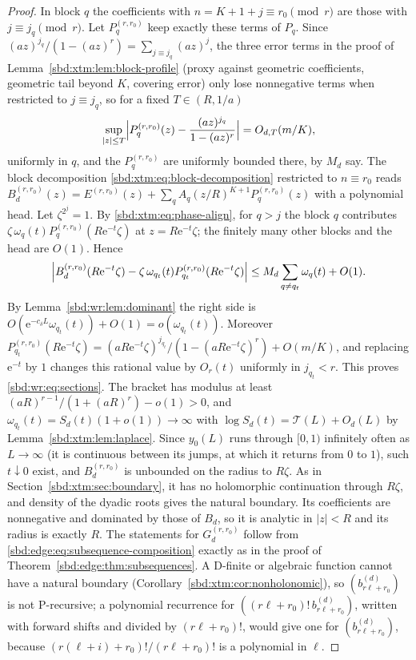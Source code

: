\documentclass[11pt,a4paper]{article}
\theoremstyle{definition}
\newcommand{\e}{\mathrm e}
\begin{document}
\begin{proof}
In block $q$ the coefficients with $n=K+1+j\equiv r_0\pmod r$ are those with
$j\equiv j_q\pmod r$. Let $P_q^{(r,r_0)}$ keep exactly these terms of $P_q$.
Since $(az)^{j_q}/(1-(az)^r)=\sum_{j\equiv j_q}(az)^j$, the three error terms
in the proof of Lemma~\ref{sbd:xtm:lem:block-profile} (proxy against
geometric coefficients, geometric tail beyond $K$, covering error) only lose
nonnegative terms when restricted to $j\equiv j_q$, so for a fixed
$T\in(R,1/a)$
\[
 \sup_{|z|\le T}\Bigl|P_q^{(r,r_0)}(z)-\frac{(az)^{j_q}}{1-(az)^r}\Bigr|
 =O_{d,T}(m/K),
\]
uniformly in $q$, and the $P_q^{(r,r_0)}$ are uniformly bounded there, by
$M_d$ say. The block decomposition \eqref{sbd:xtm:eq:block-decomposition}
restricted to $n\equiv r_0$ reads
$B_d^{(r,r_0)}(z)=E^{(r,r_0)}(z)+\sum_qA_q(z/R)^{K+1}P_q^{(r,r_0)}(z)$ with a
polynomial head. Let $\zeta^{2^j}=1$. By \eqref{sbd:xtm:eq:phase-align},
for $q>j$ the block $q$ contributes $\zeta\,\omega_q(t)P_q^{(r,r_0)}(R\e^{-t}\zeta)$
at $z=R\e^{-t}\zeta$; the finitely many other blocks and the head are
$O(1)$. Hence
\[
 \Bigl|B_d^{(r,r_0)}(R\e^{-t}\zeta)-\zeta\,\omega_{q_t}(t)
 P_{q_t}^{(r,r_0)}(R\e^{-t}\zeta)\Bigr|
 \le M_d\sum_{q\ne q_t}\omega_q(t)+O(1).
\]
By Lemma~\ref{sbd:wr:lem:dominant} the right side is
$O(\e^{-c_\delta L}\omega_{q_t}(t))+O(1)=o(\omega_{q_t}(t))$. Moreover
$P_{q_t}^{(r,r_0)}(R\e^{-t}\zeta)=(aR\e^{-t}\zeta)^{j_{q_t}}/(1-(aR\e^{-t}\zeta)^r)
+O(m/K)$, and replacing $\e^{-t}$ by $1$ changes this rational value by
$O_r(t)$ uniformly in $j_{q_t}<r$. This proves \eqref{sbd:wr:eq:sections}.
The bracket has modulus at least $(aR)^{r-1}/(1+(aR)^r)-o(1)>0$, and
$\omega_{q_t}(t)=S_d(t)(1+o(1))\to\infty$ with
$\log S_d(t)=\mathcal T(L)+O_d(L)$ by Lemma~\ref{sbd:xtm:lem:laplace}.
Since $y_0(L)$ runs through $[0,1)$ infinitely often as $L\to\infty$ (it is
continuous between its jumps, at which it returns from $0$ to $1$), such
$t\downarrow0$ exist, and $B_d^{(r,r_0)}$ is unbounded on the radius to
$R\zeta$. As in Section~\ref{sbd:xtm:sec:boundary}, it has no holomorphic
continuation through $R\zeta$, and density of the dyadic roots gives the
natural boundary. Its coefficients are nonnegative and dominated by those of
$B_d$, so it is analytic in $|z|<R$ and its radius is exactly $R$. The
statements for $G_d^{(r,r_0)}$ follow from
\eqref{sbd:edge:eq:subsequence-composition} exactly as in the proof of
Theorem~\ref{sbd:edge:thm:subsequences}. A D-finite or algebraic function
cannot have a natural boundary (Corollary~\ref{sbd:xtm:cor:nonholonomic}),
so $(b_{r\ell+r_0}^{(d)})$ is not P-recursive; a polynomial recurrence for
$((r\ell+r_0)!\,b_{r\ell+r_0}^{(d)})$, written with forward shifts and
divided by $(r\ell+r_0)!$, would give one for $(b_{r\ell+r_0}^{(d)})$,
because $(r(\ell+i)+r_0)!/(r\ell+r_0)!$ is a polynomial in $\ell$.
\end{proof}
\end{document}
